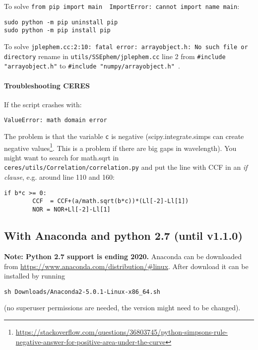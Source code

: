 \documentclass[10pt,a4paper]{article}
\begin{document}
To solve \verb|from pip import main  ImportError: cannot import name main|:
\begin{lstlisting}[style=base]
sudo python -m pip uninstall pip
sudo python -m pip install pip
\end{lstlisting}

To solve \verb|jplephem.cc:2:10: fatal error: arrayobject.h: No such file or directory| rename in \verb|utils/SSEphem/jplephem.cc| line 2 from \verb|#include "arrayobject.h"| to \verb|#include "numpy/arrayobject.h"|~.

\paragraph{Troubleshooting CERES\\}

If the script crashes with:
\begin{lstlisting}[style=base]
ValueError: math domain error
\end{lstlisting}
The problem is that the variable \verb|c| is negative (scipy.integrate.simps can create negative values\footnote{\url{https://stackoverflow.com/questions/36803745/python-simpsons-rule-negative-answer-for-positive-area-under-the-curve}}. This is a problem if there are big gaps in wavelength). You might want to search for math.sqrt in\\ \verb|ceres/utils/Correlation/correlation.py| and put the line with CCF in an \textit{if clause}, e.g. around line 110 and 160:
\begin{lstlisting}[style=base]
	if b*c >= 0:
	    CCF  = CCF+(a/math.sqrt(b*c))*(Ll[-2]-Ll[1])
	    NOR = NOR+Ll[-2]-Ll[1]
\end{lstlisting}


\subsection{With Anaconda and python 2.7 (until v1.1.0)}
\textbf{Note: Python 2.7 support is ending 2020.}
\noindent Anaconda can be downloaded from \url{https://www.anaconda.com/distribution/#linux}. After download it can be installed by running
\begin{lstlisting}[style=base]
sh Downloads/Anaconda2-5.0.1-Linux-x86_64.sh
\end{lstlisting}
(no superuser permissions are needed, the version might need to be changed).
\end{document}
